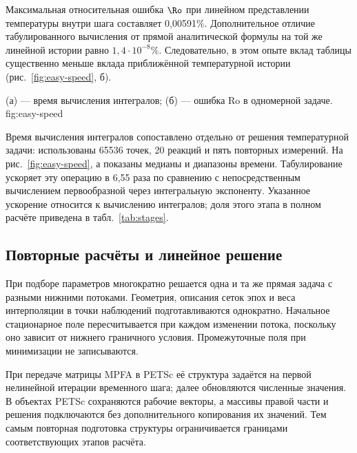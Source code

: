Максимальная относительная ошибка $\Ro$ при линейном представлении
температуры внутри шага составляет 0,00591\%.
Дополнительное отличие табулированного вычисления от прямой
аналитической формулы на той же линейной истории равно
$1{,}4\cdot10^{-8}\%$. Следовательно, в этом опыте вклад таблицы
существенно меньше вклада приближённой температурной истории
(рис.~\ref{fig:easy-speed}, б).

  {(а) --- время вычисления интегралов; (б) --- ошибка Ro в одномерной задаче.}
  {fig:easy-speed}

Время вычисления интегралов сопоставлено отдельно от решения
температурной задачи: использованы 65536 точек, 20 реакций
и пять повторных измерений. На рис.~\ref{fig:easy-speed}, а показаны
медианы и диапазоны времени. Табулирование ускоряет эту операцию
в 6,55 раза по сравнению с непосредственным вычислением первообразной
через интегральную экспоненту. Указанное ускорение относится
к вычислению интегралов; доля этого этапа в полном расчёте
приведена в табл.~\ref{tab:stages}.

\subsection{Повторные расчёты и линейное решение}

При подборе параметров многократно решается одна и та же прямая
задача с разными нижними потоками. Геометрия, описания сеток эпох
и веса интерполяции в точки наблюдений подготавливаются однократно.
Начальное стационарное поле пересчитывается при каждом изменении
потока, поскольку оно зависит от нижнего граничного условия.
Промежуточные поля при минимизации не записываются.

При передаче матрицы MPFA в PETSc её структура задаётся на первой
нелинейной итерации временного шага; далее обновляются численные
значения. В объектах PETSc сохраняются рабочие векторы,
а массивы правой части и решения подключаются без дополнительного
копирования их значений. Тем самым повторная подготовка структуры
ограничивается границами соответствующих этапов расчёта.

